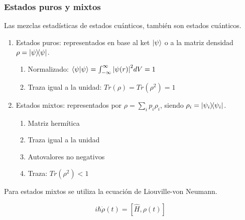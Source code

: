 \documentclass[xetex,mathserif,serif, 8pt]{beamer}
\begin{document}
\begin{frame}
    \frametitle{Estados puros y mixtos}

    Las mezclas estadísticas de estados cuánticos, también son estados cuánticos.

    \begin{enumerate}
        \item Estados puros: representados en base al ket $\ket{\psi}$ o a la matriz densidad $\rho = \ketbra{\psi}$.
            \begin{enumerate}
                \item Normalizado: $\braket{\psi} = \int_{-\infty}^{\infty} \abs{\psi(r)}^2 dV = 1$
				\item Traza igual a la unidad: $Tr(\rho) = Tr(\rho^2) = 1$
            \end{enumerate}
            \vspace{0.5cm}

        \item Estados mixtos: representados por $\rho = \sum_i p_i \rho_i$, siendo $\rho_i = \ketbra{\psi_i}$.
            \begin{enumerate}
                \item Matriz hermítica
                \item Traza igual a la unidad
                \item Autovalores no negativos
				\item Traza: $Tr(\rho^2) < 1$
            \end{enumerate}
    \end{enumerate}

    Para estados mixtos se utiliza la ecuación de Liouville-von Neumann.

    \begin{equation}
        i \hbar \dot{\rho}(t) = [\hat{H}, \rho(t)]
    \end{equation}
	
\end{frame}
\end{document}
